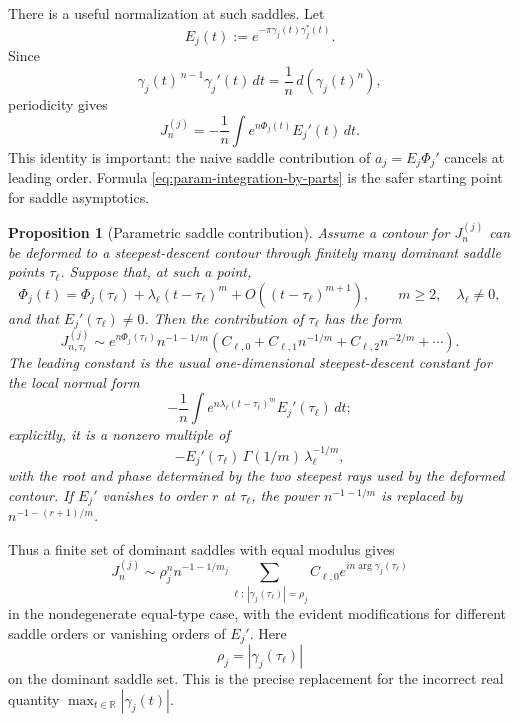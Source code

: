 \documentclass[11pt]{article}
\newtheorem{proposition}[theorem]{Proposition}
\newcommand{\R}{\mathbb R}
\newcommand{\dd}{\,d}
\newcommand{\1}{\mathbf 1}
\begin{document}
There is a useful normalization at such saddles. Let
\[
  E_j(t):=e^{-\pi\gamma_j(t)\gamma_j^*(t)}.
\]
Since
\[
  \gamma_j(t)^{\,n-1}\gamma_j'(t)\dd t
  =
  \frac1n\dd\left(\gamma_j(t)^n\right),
\]
periodicity gives
\begin{equation}\label{eq:param-integration-by-parts}
  J_n^{(j)}
  =
  -\frac1n\int e^{n\Phi_j(t)}E_j'(t)\dd t.
\end{equation}
This identity is important: the naive saddle contribution of \(a_j=E_j\Phi_j'\) cancels at
leading order. Formula \eqref{eq:param-integration-by-parts} is the safer starting point
for saddle asymptotics.

\begin{proposition}[Parametric saddle contribution]\label{prop:param-saddle}
Assume a contour for \(J_n^{(j)}\) can be deformed to a steepest-descent contour through
finitely many dominant saddle points \(\tau_\ell\). Suppose that, at such a point,
\[
  \Phi_j(t)=\Phi_j(\tau_\ell)
  +\lambda_\ell (t-\tau_\ell)^m+O((t-\tau_\ell)^{m+1}),
  \qquad
  m\ge2,\quad \lambda_\ell\ne0,
\]
and that \(E_j'(\tau_\ell)\ne0\). Then the contribution of \(\tau_\ell\) has the form
\begin{equation}\label{eq:param-saddle-form}
  J_{n,\tau_\ell}^{(j)}
  \sim
  e^{n\Phi_j(\tau_\ell)}
  n^{-1-1/m}
  \left(
    C_{\ell,0}
    +C_{\ell,1}n^{-1/m}
    +C_{\ell,2}n^{-2/m}
    +\cdots
  \right).
\end{equation}
The leading constant is the usual one-dimensional steepest-descent constant for the local
normal form
\[
  -\frac1n\int e^{n\lambda_\ell (t-\tau_\ell)^m}E_j'(\tau_\ell)\dd t;
\]
explicitly, it is a nonzero multiple of
\[
  -E_j'(\tau_\ell)\,\Gamma(1/m)\,\lambda_\ell^{-1/m},
\]
with the root and phase determined by the two steepest rays used by the deformed contour.
If \(E_j'\) vanishes to order \(r\) at \(\tau_\ell\), the power \(n^{-1-1/m}\) is replaced
by \(n^{-1-(r+1)/m}\).
\end{proposition}

Thus a finite set of dominant saddles with equal modulus gives
\begin{equation}\label{eq:param-saddle-sum}
  J_n^{(j)}
  \sim
  \rho_j^n n^{-1-1/m_j}
  \sum_{\ell:\,|\gamma_j(\tau_\ell)|=\rho_j}
  C_{\ell,0}e^{in\arg\gamma_j(\tau_\ell)}
\end{equation}
in the nondegenerate equal-type case, with the evident modifications for different saddle
orders or vanishing orders of \(E_j'\). Here
\[
  \rho_j=|\gamma_j(\tau_\ell)|
\]
on the dominant saddle set. This is the precise replacement for the incorrect real
quantity \(\max_{t\in\R}|\gamma_j(t)|\).
\end{document}

